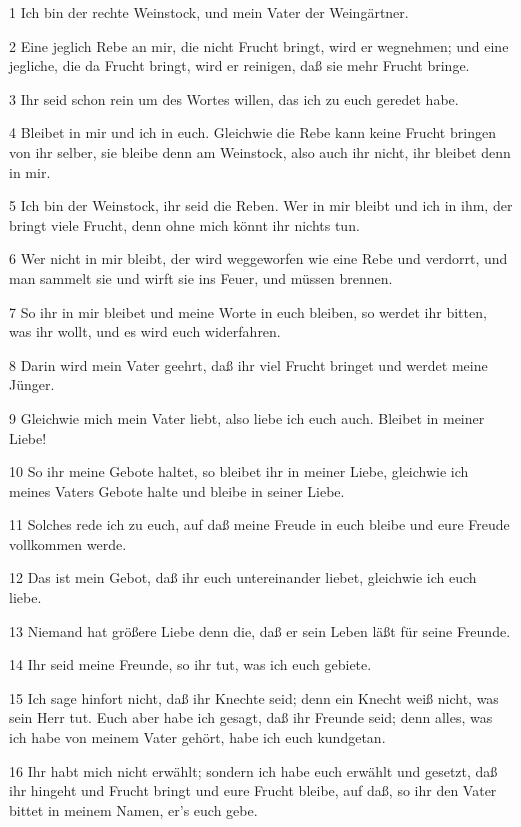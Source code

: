 \par 1 Ich bin der rechte Weinstock, und mein Vater der Weingärtner.
\par 2 Eine jeglich Rebe an mir, die nicht Frucht bringt, wird er wegnehmen; und eine jegliche, die da Frucht bringt, wird er reinigen, daß sie mehr Frucht bringe.
\par 3 Ihr seid schon rein um des Wortes willen, das ich zu euch geredet habe.
\par 4 Bleibet in mir und ich in euch. Gleichwie die Rebe kann keine Frucht bringen von ihr selber, sie bleibe denn am Weinstock, also auch ihr nicht, ihr bleibet denn in mir.
\par 5 Ich bin der Weinstock, ihr seid die Reben. Wer in mir bleibt und ich in ihm, der bringt viele Frucht, denn ohne mich könnt ihr nichts tun.
\par 6 Wer nicht in mir bleibt, der wird weggeworfen wie eine Rebe und verdorrt, und man sammelt sie und wirft sie ins Feuer, und müssen brennen.
\par 7 So ihr in mir bleibet und meine Worte in euch bleiben, so werdet ihr bitten, was ihr wollt, und es wird euch widerfahren.
\par 8 Darin wird mein Vater geehrt, daß ihr viel Frucht bringet und werdet meine Jünger.
\par 9 Gleichwie mich mein Vater liebt, also liebe ich euch auch. Bleibet in meiner Liebe!
\par 10 So ihr meine Gebote haltet, so bleibet ihr in meiner Liebe, gleichwie ich meines Vaters Gebote halte und bleibe in seiner Liebe.
\par 11 Solches rede ich zu euch, auf daß meine Freude in euch bleibe und eure Freude vollkommen werde.
\par 12 Das ist mein Gebot, daß ihr euch untereinander liebet, gleichwie ich euch liebe.
\par 13 Niemand hat größere Liebe denn die, daß er sein Leben läßt für seine Freunde.
\par 14 Ihr seid meine Freunde, so ihr tut, was ich euch gebiete.
\par 15 Ich sage hinfort nicht, daß ihr Knechte seid; denn ein Knecht weiß nicht, was sein Herr tut. Euch aber habe ich gesagt, daß ihr Freunde seid; denn alles, was ich habe von meinem Vater gehört, habe ich euch kundgetan.
\par 16 Ihr habt mich nicht erwählt; sondern ich habe euch erwählt und gesetzt, daß ihr hingeht und Frucht bringt und eure Frucht bleibe, auf daß, so ihr den Vater bittet in meinem Namen, er's euch gebe.
